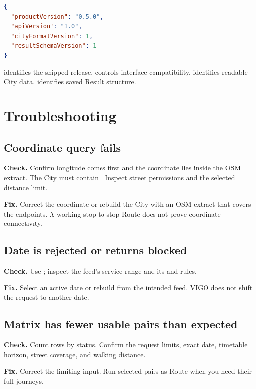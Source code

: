 \documentclass[10pt,letterpaper]{article}
\begin{document}
\begin{lstlisting}[language=json]
{
  "productVersion": "0.5.0",
  "apiVersion": "1.0",
  "cityFormatVersion": 1,
  "resultSchemaVersion": 1
}
\end{lstlisting}

 identifies the shipped release.  controls interface compatibility.  identifies readable City data.  identifies saved Result structure.

\section{Troubleshooting}

\subsection{Coordinate query fails}

\textbf{Check.} Confirm longitude comes first and the coordinate lies inside the OSM extract. The City must contain . Inspect street permissions and the selected distance limit.

\textbf{Fix.} Correct the coordinate or rebuild the City with an OSM extract that covers the endpoints. A working stop-to-stop Route does not prove coordinate connectivity.

\subsection{Date is rejected or returns blocked}

\textbf{Check.} Use ; inspect the feed's service range and its  and  rules.

\textbf{Fix.} Select an active date or rebuild from the intended feed. VIGO does not shift the request to another date.

\subsection{Matrix has fewer usable pairs than expected}

\textbf{Check.} Count rows by status. Confirm the request limits, exact date, timetable horizon, street coverage, and walking distance.

\textbf{Fix.} Correct the limiting input. Run selected pairs as Route when you need their full journeys.
\end{document}
